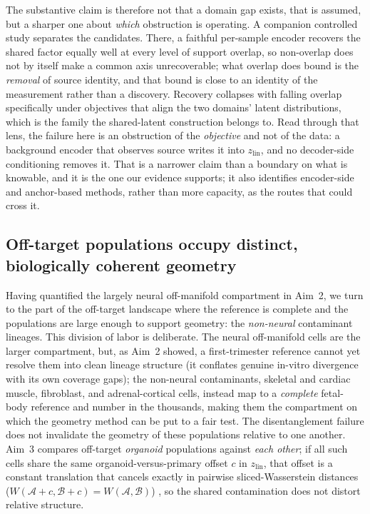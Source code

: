 \documentclass[11pt]{article}
\newcommand{\zlin}{\ensuremath{z_{\mathrm{lin}}}}
\begin{document}
The substantive claim is therefore not that a domain gap exists, that is assumed, but a sharper one about
\emph{which} obstruction is operating. A companion controlled study \citep{nullstate2026identifiability}
separates the candidates. There, a faithful per-sample encoder recovers the shared factor equally well at
every level of support overlap, so non-overlap does not by itself make a common axis unrecoverable; what
overlap does bound is the \emph{removal} of source identity, and that bound is close to an identity of the
measurement rather than a discovery. Recovery collapses with falling overlap specifically under objectives
that align the two domains' latent distributions, which is the family the shared-latent construction
belongs to. Read through that lens, the failure here is an obstruction of the \emph{objective} and not of
the data: a background encoder that observes source writes it into \zlin{}, and no decoder-side
conditioning removes it. That is a narrower claim than a boundary on what is knowable, and it is the one
our evidence supports; it also identifies encoder-side and anchor-based methods, rather than more
capacity, as the routes that could cross it.

\subsection{Off-target populations occupy distinct, biologically coherent geometry}
Having quantified the largely neural off-manifold compartment in Aim~2, we turn to the part of the
off-target landscape where the reference is complete and the populations are large enough to support
geometry: the \emph{non-neural} contaminant lineages. This division of labor is deliberate. The neural
off-manifold cells are the larger compartment, but, as Aim~2 showed, a first-trimester reference cannot
yet resolve them into clean lineage structure (it conflates genuine in-vitro divergence with its own
coverage gaps); the non-neural contaminants, skeletal and cardiac muscle, fibroblast, and
adrenal-cortical cells, instead map to a \emph{complete} fetal-body reference and number in the
thousands, making them the compartment on which the geometry method can be put to a fair test. The
disentanglement failure does not invalidate the geometry of these populations relative to one another.
Aim~3 compares off-target \emph{organoid} populations against \emph{each
other}; if all such cells share the same organoid-versus-primary offset $c$ in \zlin, that offset is a
constant translation that cancels exactly in pairwise sliced-Wasserstein distances
($W(\mathcal{A}{+}c,\mathcal{B}{+}c)=W(\mathcal{A},\mathcal{B})$) \citep{bonneel2015sliced}, so the
shared contamination does not distort relative structure.
\end{document}
